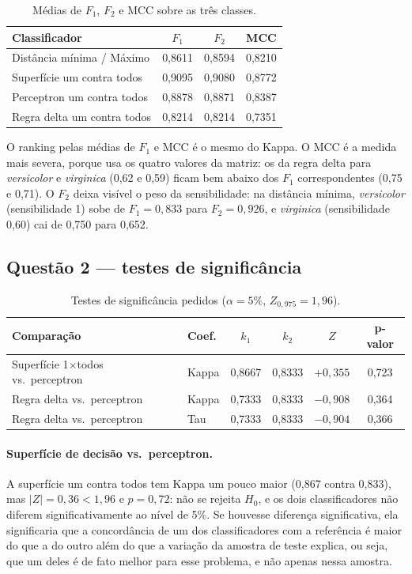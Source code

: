 \documentclass[12pt,a4paper]{article}
\newcommand{\versicolor}{\emph{versicolor}}
\newcommand{\virginica}{\emph{virginica}}
\begin{document}
\begin{table}[H]
\centering
\caption{Médias de $F_1$, $F_2$ e MCC sobre as três classes.}
\label{tab:medias}
\begin{tabular}{lccc}
\toprule
Classificador & $F_1$ & $F_2$ & MCC \\
\midrule
Distância mínima / Máximo   & 0,8611 & 0,8594 & 0,8210 \\
Superfície um contra todos  & 0,9095 & 0,9080 & 0,8772 \\
Perceptron um contra todos  & 0,8878 & 0,8871 & 0,8387 \\
Regra delta um contra todos & 0,8214 & 0,8214 & 0,7351 \\
\bottomrule
\end{tabular}
\end{table}

O ranking pelas médias de $F_1$ e MCC é o mesmo do Kappa. O MCC é a medida mais severa, porque usa os quatro valores da matriz: os da regra delta para \versicolor{} e \virginica{} (0,62 e 0,59) ficam bem abaixo dos $F_1$ correspondentes (0,75 e 0,71). O $F_2$ deixa visível o peso da sensibilidade: na distância mínima, \versicolor{} (sensibilidade 1) sobe de $F_1 = 0{,}833$ para $F_2 = 0{,}926$, e \virginica{} (sensibilidade 0,60) cai de 0,750 para 0,652.

\subsection{Questão 2 --- testes de significância}

\begin{table}[H]
\centering
\caption{Testes de significância pedidos ($\alpha = 5\%$, $Z_{0{,}975} = 1{,}96$).}
\label{tab:testes}
\begin{tabular}{llcccc}
\toprule
Comparação & Coef. & $k_1$ & $k_2$ & $Z$ & p-valor \\
\midrule
Superfície 1$\times$todos vs.\ perceptron   & Kappa & 0,8667 & 0,8333 & $+0{,}355$ & 0,723 \\
Regra delta vs.\ perceptron                 & Kappa & 0,7333 & 0,8333 & $-0{,}908$ & 0,364 \\
Regra delta vs.\ perceptron                 & Tau   & 0,7333 & 0,8333 & $-0{,}904$ & 0,366 \\
\bottomrule
\end{tabular}
\end{table}

\paragraph{Superfície de decisão vs.\ perceptron.} A superfície um contra todos tem Kappa um pouco maior (0,867 contra 0,833), mas $|Z| = 0{,}36 < 1{,}96$ e $p = 0{,}72$: não se rejeita $H_0$, e os dois classificadores não diferem significativamente ao nível de 5\%. Se houvesse diferença significativa, ela significaria que a concordância de um dos classificadores com a referência é maior do que a do outro além do que a variação da amostra de teste explica, ou seja, que um deles é de fato melhor para esse problema, e não apenas nessa amostra.
\end{document}
